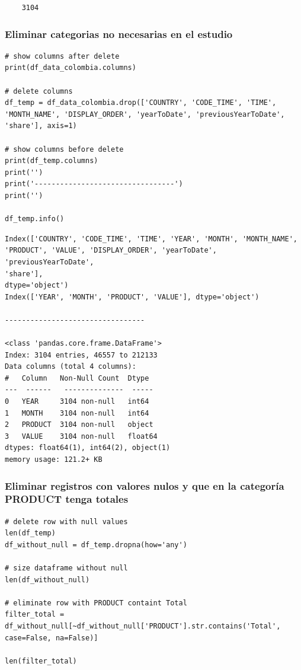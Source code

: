 \documentclass{article}
\begin{document}
\begin{verbatim}
	3104
\end{verbatim}

\subsubsection{Eliminar categorias no necesarias en el estudio}

\begin{verbatim}
# show columns after delete
print(df_data_colombia.columns)

# delete columns
df_temp = df_data_colombia.drop(['COUNTRY', 'CODE_TIME', 'TIME', 'MONTH_NAME', 'DISPLAY_ORDER', 'yearToDate', 'previousYearToDate', 'share'], axis=1)

# show columns before delete
print(df_temp.columns)
print('')
print('---------------------------------')
print('')

df_temp.info()
\end{verbatim}

\begin{verbatim}
Index(['COUNTRY', 'CODE_TIME', 'TIME', 'YEAR', 'MONTH', 'MONTH_NAME',
'PRODUCT', 'VALUE', 'DISPLAY_ORDER', 'yearToDate', 'previousYearToDate',
'share'],
dtype='object')
Index(['YEAR', 'MONTH', 'PRODUCT', 'VALUE'], dtype='object')

---------------------------------

<class 'pandas.core.frame.DataFrame'>
Index: 3104 entries, 46557 to 212133
Data columns (total 4 columns):
#   Column   Non-Null Count  Dtype  
---  ------   --------------  -----  
0   YEAR     3104 non-null   int64  
1   MONTH    3104 non-null   int64  
2   PRODUCT  3104 non-null   object 
3   VALUE    3104 non-null   float64
dtypes: float64(1), int64(2), object(1)
memory usage: 121.2+ KB
\end{verbatim}

\subsubsection{Eliminar registros con valores nulos y que en la categor\'ia PRODUCT tenga totales}

\begin{verbatim}
# delete row with null values
len(df_temp)
df_without_null = df_temp.dropna(how='any')

# size dataframe without null
len(df_without_null)

# eliminate row with PRODUCT containt Total
filter_total = df_without_null[~df_without_null['PRODUCT'].str.contains('Total', case=False, na=False)]

len(filter_total)
\end{verbatim}
\end{document}
